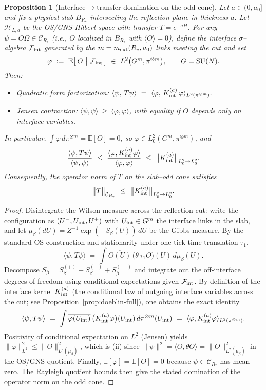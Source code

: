 \documentclass[11pt]{amsart}
\theoremstyle{plain}
\newtheorem{proposition}[theorem]{Proposition}
\theoremstyle{definition}
\theoremstyle{remark}
\begin{document}
\begin{proposition}[Interface$\to$transfer domination on the odd cone]\label{prop:int-to-transfer}
Let $a\in(0,a_0]$ and fix a physical slab $B_{R_*}$ intersecting the reflection plane in thickness $a$. Let $\mathcal H_{L,a}$ be the OS/GNS Hilbert space with transfer $T=e^{-aH}$. For any $\psi=O\Omega\in\mathcal C_{R_*}$ (i.e., $O$ localized in $B_{R_*}$ with $\langle O\rangle=0$), define the interface $\sigma$--algebra $\mathcal F_{\rm int}$ generated by the $m=m_{\rm cut}(R_*,a_0)$ links meeting the cut and set
\[
  \varphi\ :=\ \mathbb E\big[\,O\ \big|\ \mathcal F_{\rm int}\,\big]\ \in\ L^2\big(G^m,\pi^{\otimes m}\big),\qquad G=\mathrm{SU}(N).
\]
Then:
\begin{itemize}
  \item[(i)] Quadratic form factorization: \(\langle \psi,\,T\psi\rangle\ =\ \langle \varphi,\,K_{\rm int}^{(a)}\,\varphi\rangle_{L^2(\pi^{\otimes m})}.\)
  \item[(ii)] Jensen contraction: \(\langle \psi,\psi\rangle\ \ge\ \langle \varphi,\varphi\rangle\), with equality if $O$ depends only on interface variables.
\end{itemize}
In particular, $\int \varphi\,d\pi^{\otimes m}=\mathbb E[O]=0$, so $\varphi\in L^2_0(G^m,\pi^{\otimes m})$, and
\[
  \frac{\langle \psi, T\psi\rangle}{\langle \psi,\psi\rangle}
  \ \le\ \frac{\langle \varphi, K_{\rm int}^{(a)}\varphi\rangle}{\langle \varphi,\varphi\rangle}
  \ \le\ \big\|K_{\rm int}^{(a)}\big\|_{L^2_0\to L^2_0}.
\]
Consequently, the operator norm of $T$ on the slab--odd cone satisfies
\[
  \big\|T\big\|_{\mathcal C_{R_*}}\ \le\ \big\|K_{\rm int}^{(a)}\big\|_{L^2_0\to L^2_0}.
\]
\end{proposition}
\begin{proof}
Disintegrate the Wilson measure across the reflection cut: write the configuration as $(U^-,U_{\rm int},U^+)$ with $U_{\rm int}\in G^m$ the interface links in the slab, and let $\mu_\beta(dU)=Z^{-1}\exp(-S_\beta(U))\,dU$ be the Gibbs measure. By the standard OS construction and stationarity under one-tick time translation $\tau_1$,
\[
  \langle \psi, T\psi\rangle\ =\ \int \overline{O(U)}\,\big(\theta\,\tau_1 O\big)(U)\,d\mu_\beta(U).
\]
Decompose $S_\beta=S_\beta^{(+)}+S_\beta^{(-)}+S_\beta^{(\perp)}$ and integrate out the off-interface degrees of freedom using conditional expectations given $\mathcal F_{\rm int}$. By definition of the interface kernel $K_{\rm int}^{(a)}$ (the conditional law of outgoing interface variables across the cut; see Proposition~\ref{prop:doeblin-full}), one obtains the exact identity
\[
  \langle \psi, T\psi\rangle\ =\ \int \overline{\varphi(U_{\rm int})}\,\big(K_{\rm int}^{(a)}\varphi\big)(U_{\rm int})\,d\pi^{\otimes m}(U_{\rm int})
  \ =\ \langle \varphi, K_{\rm int}^{(a)}\varphi\rangle_{L^2(\pi^{\otimes m})}.
\]
Positivity of conditional expectation on $L^2$ (Jensen) yields $\|\varphi\|_{L^2}^2\le \|O\|_{L^2(\mu_\beta)}^2$, which is (ii) since $\|\psi\|^2=\langle O,\theta O\rangle=\|O\|_{L^2(\mu_\beta)}^2$ in the OS/GNS quotient. Finally, $\mathbb E[\varphi]=\mathbb E[O]=0$ because $\psi\in\mathcal C_{R_*}$ has mean zero. The Rayleigh quotient bounds then give the stated domination of the operator norm on the odd cone.
\end{proof}
\end{document}
